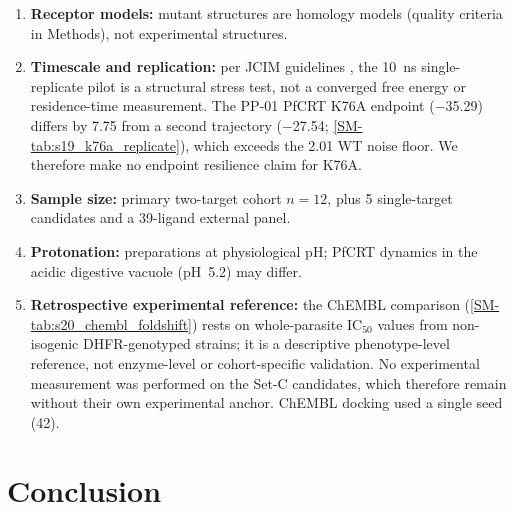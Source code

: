 \documentclass[journal=jcisd8,manuscript=article,layout=traditional]{achemso}
\begin{document}
\begin{enumerate}
    \item \textbf{Receptor models:} mutant structures are homology models (quality criteria in Methods), not experimental structures.
    \item \textbf{Timescale and replication:} per JCIM guidelines \citep{soares2023mdreport}, the \qty{10}{\ns} single-replicate pilot is a structural stress test, not a converged free energy or residence-time measurement. The PP-01 PfCRT K76A endpoint (\qty{-35.29}{\kcalmol}) differs by \qty{7.75}{\kcalmol} from a second trajectory (\qty{-27.54}{\kcalmol}; \cref{SM-tab:s19_k76a_replicate}), which exceeds the \qty{2.01}{\kcalmol} WT noise floor. We therefore make no endpoint resilience claim for K76A.
    \item \textbf{Sample size:} primary two-target cohort $n=\num{12}$, plus 5 single-target candidates and a 39-ligand external panel.
    \item \textbf{Protonation:} preparations at physiological pH; PfCRT dynamics in the acidic digestive vacuole (pH~\num{5.2}) may differ.
    \item \textbf{Retrospective experimental reference:} the ChEMBL comparison (\cref{SM-tab:s20_chembl_foldshift}) rests on whole-parasite IC$_{50}$ values from non-isogenic DHFR-genotyped strains; it is a descriptive phenotype-level reference, not enzyme-level or cohort-specific validation. No experimental measurement was performed on the Set-C candidates, which therefore remain without their own experimental anchor. ChEMBL docking used a single seed (\num{42}).
\end{enumerate}


\section{Conclusion}
\end{document}
